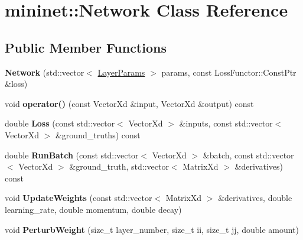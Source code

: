 \hypertarget{classmininet_1_1_network}{}\section{mininet\+:\+:Network Class Reference}
\label{classmininet_1_1_network}
\subsection*{Public Member Functions}
\begin{DoxyCompactItemize}
\item 
\hypertarget{classmininet_1_1_network_acf2c102c6f79c152380124af7b327b89}{}\label{classmininet_1_1_network_acf2c102c6f79c152380124af7b327b89} 
{\bfseries Network} (std\+::vector$<$ \hyperlink{structmininet_1_1_layer_params}{Layer\+Params} $>$ params, const Loss\+Functor\+::\+Const\+Ptr \&loss)
\item 
\hypertarget{classmininet_1_1_network_a56fe1d7f1daf3433c9f0d5df408b4800}{}\label{classmininet_1_1_network_a56fe1d7f1daf3433c9f0d5df408b4800} 
void {\bfseries operator()} (const Vector\+Xd \&input, Vector\+Xd \&output) const
\item 
\hypertarget{classmininet_1_1_network_ae76628cf7258aa0b8d0ee147e580623e}{}\label{classmininet_1_1_network_ae76628cf7258aa0b8d0ee147e580623e} 
double {\bfseries Loss} (const std\+::vector$<$ Vector\+Xd $>$ \&inputs, const std\+::vector$<$ Vector\+Xd $>$ \&ground\+\_\+truths) const
\item 
\hypertarget{classmininet_1_1_network_a52d7bf3f7a6ff4ca2d2fe93758b48cc0}{}\label{classmininet_1_1_network_a52d7bf3f7a6ff4ca2d2fe93758b48cc0} 
double {\bfseries Run\+Batch} (const std\+::vector$<$ Vector\+Xd $>$ \&batch, const std\+::vector$<$ Vector\+Xd $>$ \&ground\+\_\+truth, std\+::vector$<$ Matrix\+Xd $>$ \&derivatives) const
\item 
\hypertarget{classmininet_1_1_network_a0b6fbe0845a41ccf41f09ac62d355699}{}\label{classmininet_1_1_network_a0b6fbe0845a41ccf41f09ac62d355699} 
void {\bfseries Update\+Weights} (const std\+::vector$<$ Matrix\+Xd $>$ \&derivatives, double learning\+\_\+rate, double momentum, double decay)
\item 
\hypertarget{classmininet_1_1_network_a3b1a8593348f1e0aa1a4a1457d3d6ab2}{}\label{classmininet_1_1_network_a3b1a8593348f1e0aa1a4a1457d3d6ab2} 
void {\bfseries Perturb\+Weight} (size\+\_\+t layer\+\_\+number, size\+\_\+t ii, size\+\_\+t jj, double amount)
\end{DoxyCompactItemize}



